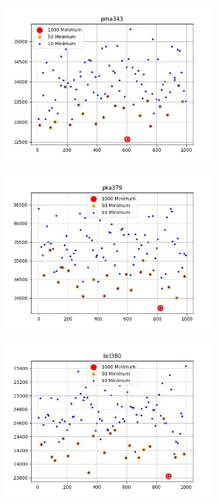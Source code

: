 \documentclass{article}
\def\v{0.4}
\begin{document}
\begin{figure}[h!]
\begin{subfigure}[b]{\v\linewidth}
		\includegraphics[width=\linewidth]{graphs/min_pma343.png}
	\end{subfigure}
	\begin{subfigure}[b]{\v\linewidth}
		\includegraphics[width=\linewidth]{graphs/min_pka379.png}
	\end{subfigure}
	\begin{subfigure}[b]{\v\linewidth}
		\includegraphics[width=\linewidth]{graphs/min_bcl380.png}

\end{subfigure}
\end{figure}
\end{document}
